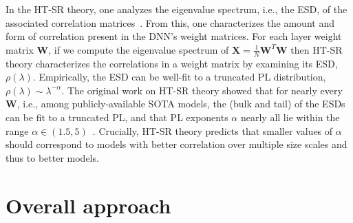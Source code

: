 \documentclass{article}
\begin{document}
In the HT-SR theory, one analyzes the eigenvalue spectrum, i.e., the ESD, of the associated correlation matrices~\citep{MM18_TR,MM19_HTSR_ICML,MM20_SDM}.
From this, one characterizes the amount and form of correlation present in the DNN's weight matrices.
For each layer weight matrix $\mathbf{W}$, if we compute the eigenvalue spectrum of 
$ \mathbf{X} = \frac{1}{N}\mathbf{W}^{T}\mathbf{W} $
then HT-SR theory characterizes the correlations in a weight matrix by examining its ESD, $\rho(\lambda)$.
Empirically, the ESD can be well-fit to a truncated PL distribution, 
$\rho(\lambda)\sim\lambda^{-\alpha} $.
%
The original work on HT-SR theory showed that for nearly every $\mathbf{W}$, i.e., among publicly-available SOTA models, the (bulk and tail) of the ESDs can be fit to a truncated PL, and that PL exponents $\alpha$ nearly all lie within the range $\alpha\in(1.5,5)$~\citep{MM18_TR,MM19_HTSR_ICML,MM20_SDM}.
%
%
Crucially, HT-SR theory predicts that smaller values of $\alpha$ should correspond to models with better correlation over multiple size scales and thus to better models.


\section*{Overall approach}
\end{document}
